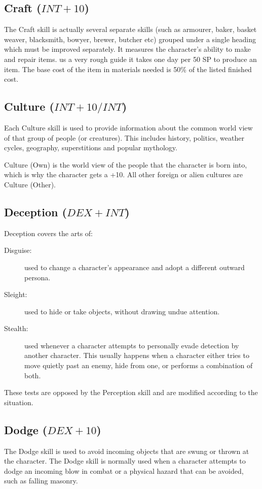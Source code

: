 \subsection{Craft ($INT+10$)}
The Craft skill is actually several separate skills (such as armourer, baker, basket weaver, blacksmith, bowyer, brewer, butcher etc) grouped under a single heading which must be improved separately. It measures the character’s ability to make and repair items.
us a very rough guide it takes one day per 50 SP to produce an item. The base cost of the item in materials needed is 50\% of the listed finished cost.

\subsection{Culture ($INT+10/INT$)}
Each Culture skill is used to provide information about the common world view of that group of people (or creatures). This includes history, politics, weather cycles, geography, superstitions and popular mythology. 

Culture (Own) is the world view of the people that the character is born into, which is why the character gets a +10. All other foreign or alien cultures are Culture (Other).

\subsection{Deception ($DEX +INT$)}
Deception covers the arts of:
\begin{description}
	\item[Disguise:] used to change a character’s appearance and adopt a different outward persona. 
	\item[Sleight:] used to hide or take objects, without drawing undue attention. 
	\item[Stealth:] used whenever a character attempts to personally evade detection by another character. This usually happens when a character either tries to move quietly past an enemy, hide from one, or performs a combination of both.
\end{description}

These tests are opposed by the Perception skill and are modified according to the situation. 

\subsection{Dodge ($DEX+10$)}
The Dodge skill is used to avoid incoming objects that are swung or thrown at the character. The Dodge skill is normally used when a character attempts to dodge an incoming blow in combat or a physical hazard that can be avoided, such as falling masonry. 

